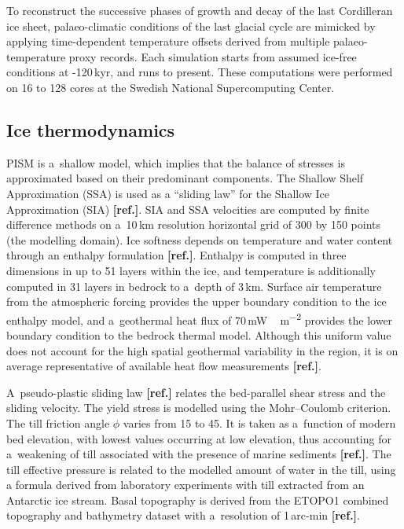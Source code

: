 \documentclass[tc, ms]{copernicus}
\newcommand{\aref}[0]{\textbf{[ref.]}}
\renewcommand{\citep}[1]{\aref}
\begin{document}
To reconstruct the successive phases of growth and decay of the last Cordilleran
ice sheet, palaeo-climatic conditions of the last glacial cycle are mimicked
by applying time-dependent temperature offsets derived from multiple
palaeo-temperature proxy records. Each simulation starts from assumed ice-free
conditions at -120\,kyr, and runs to present. These computations were
performed on 16 to 128 cores at the Swedish National Supercomputing
Center.

\subsection{Ice thermodynamics}

PISM is a~shallow model, which implies that the balance of stresses is
approximated based on their predominant components.
The Shallow Shelf Approximation (SSA) is used as a ``sliding law'' for the
Shallow Ice Approximation (SIA) \citep{bueler-brown-2009,winkelmann-etal-2011}.
SIA and SSA velocities are computed by finite difference methods on a~10\,km
resolution horizontal grid of 300 by 150 points (the modelling domain). Ice
softness depends on temperature and water content through an enthalpy
formulation \citep{aschwanden-blatter-2009,aschwanden-etal-2012}. Enthalpy is
computed in three dimensions in up to 51 layers within the
ice, and temperature is additionally computed in 31 layers in bedrock to
a~depth of 3\,km. Surface air temperature from the atmospheric forcing
provides the upper boundary condition to the ice enthalpy model, and
a~geothermal heat flux of 70\,\unit{mW\,m^{-2}} provides the lower boundary
condition to the bedrock thermal model. Although this uniform value does not
account for the high spatial geothermal variability in the region, it is on
average representative of available heat flow measurements
\citep{artemieva-mooney-2001,blackwell-richards-2004}.

A~pseudo-plastic sliding law \citep{aschwanden-etal-2013} relates the
bed-parallel shear stress and the sliding velocity. The yield stress is
modelled using the Mohr--Coulomb criterion. The till friction angle $\phi$
varies from 15 to 45{\degree}. It is taken as a~function of modern bed
elevation, with lowest values occurring at low elevation, thus accounting
for a~weakening of till associated with the presence of marine sediments
\citep{martin-etal-2011,aschwanden-etal-2013}. The till effective pressure is
related to the modelled amount of water in the till, using a formula derived
from laboratory experiments with till extracted from an Antarctic ice stream.
Basal topography is derived from the ETOPO1 combined topography
and bathymetry dataset with a~resolution of 1\,arc-min \citep{data:etopo1}.
\end{document}

